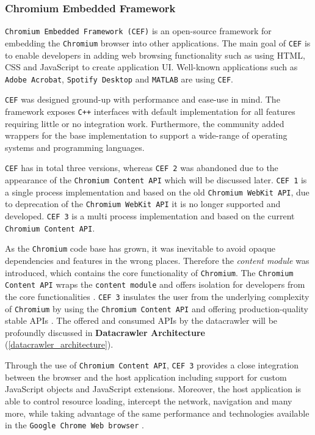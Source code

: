 \subsubsection{Chromium Embedded Framework}
\texttt{Chromium Embedded Framework (CEF)} is an open-source framework for embedding the \texttt{Chromium} browser into other applications. The main goal of \texttt{CEF} is to enable developers in adding web browsing functionality such as using HTML, CSS and JavaScript to create application UI. Well-known applications such as \texttt{Adobe Acrobat}, \texttt{Spotify Desktop} and \texttt{MATLAB} are using \texttt{CEF}.

\texttt{CEF} was designed ground-up with performance and ease-use in mind. The framework exposes \texttt{C++} interfaces with default implementation for all features requiring little or no integration work. Furthermore, the community added wrappers for the base implementation to support a wide-range of operating systems and programming languages.

\texttt{CEF} has in total three versions, whereas \texttt{CEF 2} was abandoned due to the appearance of the \texttt{Chromium Content API} which will be discussed later. \texttt{CEF 1} is a single process implementation and based on the old \texttt{Chromium WebKit API}, due to deprecation of the \texttt{Chromium WebKit API} it is no longer supported and developed. \texttt{CEF 3} is a multi process implementation and based on the current \texttt{Chromium Content API}.

As the \texttt{Chromium} code base has grown, it was inevitable to avoid opaque dependencies and features in the wrong places. Therefore the \textit{content module} was introduced, which contains the core functionality of \texttt{Chromium}. The \texttt{Chromium Content API} wraps the \texttt{content module} and offers isolation for developers from the core functionalities \cite{ChromiumContentAPI}.
\texttt{CEF 3} insulates the user from the underlying complexity of \texttt{Chromium} by using the \texttt{Chromium Content API} and offering production-quality stable APIs \cite{CEFGeneralUsage}. The offered and consumed APIs by the datacrawler will be profoundly discussed in \textbf{Datacrawler Architecture} (\ref{datacrawler_architecture}).

Through the use of \texttt{Chromium Content API}, \texttt{CEF 3} provides a close integration between the browser and the host application including support for custom JavaScript objects and JavaScript extensions. Moreover, the host application is able to control resource loading, intercept the network, navigation and many more, while taking advantage of the same performance and technologies available in the \texttt{Google Chrome Web browser} \cite{CEFGeneralUsage}.

